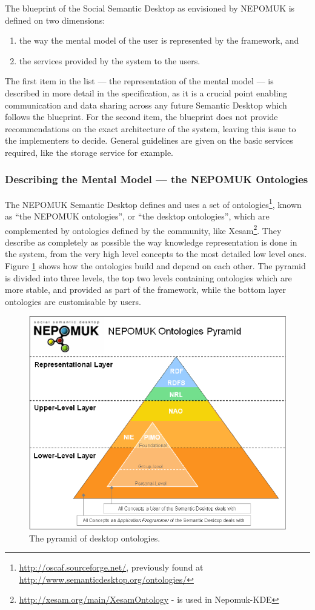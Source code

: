 The blueprint of the Social Semantic Desktop as envisioned by NEPOMUK is defined on two dimensions:
\begin{enumerate}
 \item the way the mental model of the user is represented by the framework, and
 \item the services provided by the system to the users.
\end{enumerate}

The first item in the list --- the representation of the mental model --- is described in more detail in the specification, as it is a crucial point enabling communication and data sharing across any future Semantic Desktop which follows the blueprint. For the second item, the blueprint does not provide recommendations on the exact architecture of the system, leaving this issue to the implementers to decide. General guidelines are given on the basic services required, like the storage service for example.

\subsubsection{Describing the Mental Model --- the NEPOMUK Ontologies}

The NEPOMUK Semantic Desktop defines and uses a set of ontologies\footnote{\url{http://oscaf.sourceforge.net/}, previously found at \url{http://www.semanticdesktop.org/ontologies/}}, known as ``the NEPOMUK ontologies'', or ``the desktop ontologies'', which are complemented by ontologies defined by the community, like Xesam\footnote{\url{http://xesam.org/main/XesamOntology} - is used in Nepomuk-KDE}. 
They describe as completely as possible the way knowledge representation is done in the system, from the very high level concepts to the most detailed low level ones. Figure \ref{fig:ontologiespyramid} \cite{Reif2008} shows how the ontologies build and depend on each other. The pyramid is divided into three levels, the top two levels containing ontologies which are more stable, and provided as part of the framework, while the bottom layer ontologies are customisable by users. 

\begin{figure}[tb]
 \includegraphics[width=0.8\linewidth]{chapters/background/img/ontologies.png}
\caption{The pyramid of desktop ontologies.}
\label{fig:ontologiespyramid}
\end{figure} 

